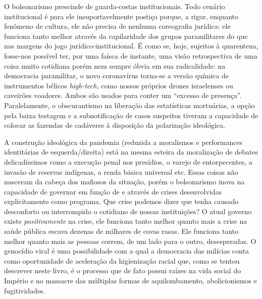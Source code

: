 O bolsonarismo prescinde de guarda-costas institucionais. Todo cenário
institucional é para ele insuportavelmente postiço porque, a rigor,
enquanto fenômeno de cultura, ele não precisa de nenhuma coreografia
jurídica: ele funciona tanto melhor através da capilaridade dos grupos
paramilitares do que nas margens do jogo jurídico-institucional. É como
se, hoje, sujeitos à quarentena, fosse-nos possível ter, por uma faísca
de instante, uma visão retrospectiva de uma coisa muito cotidiana porém
nem sempre óbvia em sua radicalidade: na democracia paramilitar, o novo
coronavírus torna-se a versão química de instrumentos bélicos
\emph{high-tech,} como nossos próprios drones israelenses ou caveirões
voadores. Ambos são usados para conter um ``excesso de presença''.
Paralelamente, o obscurantismo na liberação das estatísticas mortuárias,
a opção pela baixa testagem e a subnotificação de casos suspeitos
tiveram a capacidade de colocar as fazendas de cadáveres à disposição da
polarização ideológica.~

A construção ideológica da pandemia (reduzida a moralismos e
performances identitárias de esquerda/direita) está na mesma esteira da
moralização de debates delicadíssimos como a execução penal nos
presídios, o varejo de entorpecentes, a invasão de reservas indígenas, a
renda básica universal etc. Essas coisas não nasceram da cabeça dos
mafiosos da situação, porém o bolsonarismo inova na capacidade de
governar em função de e através de crises desenvolvidas explicitamente
como programa. Que crise podemos dizer que tenha causado desconforto ou
interrompido o cotidiano de nossas instituições? O atual governo existe
\emph{positivamente} na crise, ele funciona tanto melhor quanto mais a
crise na saúde pública escava dezenas de milhares de covas rasas. Ele
funciona tanto melhor quanto mais as pessoas correm, de um lado para o
outro, desesperadas. O genocídio viral é uma possibilidade com a qual a
democracia das milícias conta como oportunidade de aceleração da
higienização racial que, como se tentou descrever neste livro, é o
processo que de fato possui raízes na vida social do Império e no
massacre das múltiplas formas de aquilombamento, abolicionismos e
fugitividades.~

